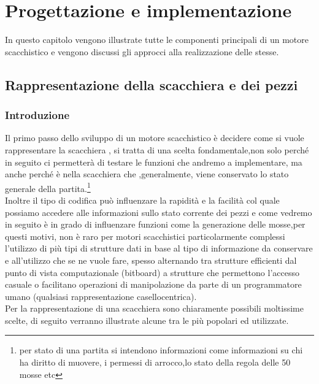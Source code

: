 \chapter{Progettazione e implementazione}
%

\begin{citazione}
    In questo capitolo vengono illustrate tutte le componenti principali di un motore scacchistico e vengono discussi gli approcci alla realizzazione delle stesse.
\end{citazione}

\newpage
\section{Rappresentazione della scacchiera e dei pezzi}

\subsection{Introduzione} %
Il primo passo dello sviluppo di un motore scacchistico è decidere come si vuole rappresentare
la scacchiera , si tratta di una scelta fondamentale,non solo perché in seguito ci permetterà
di testare le funzioni che andremo a implementare, ma anche perché è nella scacchiera che ,generalmente,
viene conservato lo stato generale della partita.\footnote{per stato di una partita si intendono informazioni come
    informazioni su chi ha diritto di muovere, i permessi di arrocco,lo stato della regola delle 50 mosse etc}
\\Inoltre il tipo di codifica può influenzare la rapidità
e la facilità col quale possiamo accedere alle informazioni sullo stato corrente dei pezzi
e come vedremo in seguito è in grado di influenzare funzioni come la generazione delle mosse,per questi motivi,
non è raro per motori scacchistici particolarmente complessi l'utilizzo di più tipi di strutture dati in base
al tipo di informazione da conservare e all'utilizzo che se ne vuole fare, spesso alternando tra strutture efficienti dal punto di vista computazionale (bitboard) a strutture che permettono l'accesso casuale o facilitano 
operazioni di manipolazione da parte di un programmatore umano (qualsiasi rappresentazione casellocentrica).
\\Per la rappresentazione di una scacchiera sono chiaramente possibili moltissime scelte, di seguito
verranno illustrate alcune tra le più popolari ed utilizzate.

